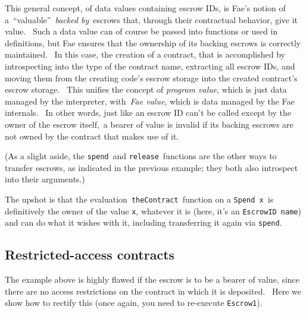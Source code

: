 \documentclass[11pt]{article}
\begin{document}

\vspace{11pt}

This general concept, of data values containing escrow IDs, is Fae's notion of a “valuable” \textit{backed by} escrows that, through their contractual behavior, give it value.  Such a data value can of course be passed into functions or used in definitions, but Fae ensures that the ownership of its backing escrows is correctly maintained.  In this case, the creation of a contract, that is accomplished by introspecting into the type of the contract name, extracting all escrow IDs, and moving them from the creating code's escrow storage into the created contract's escrow storage.  This unifies the concept of \textit{program value}, which is just data managed by the interpreter, with \textit{Fae value}, which is data managed by the Fae internals.  In other words, just like an escrow ID can't be called except by the owner of the escrow itself, a bearer of value is invalid if its backing escrows are not owned by the contract that makes use of it.


\vspace{11pt}

(As a slight aside, the \texttt{spend} and \texttt{release} functions are the other ways to transfer escrows, as indicated in the previous example; they both also introspect into their arguments.)


\vspace{11pt}

The upshot is that the evaluation \texttt{theContract} function on a \texttt{Spend x} is definitively the owner of the value \texttt{x}, whatever it is (here, it's an \texttt{EscrowID name}) and can do what it wishes with it, including transferring it again via \texttt{spend}.

\subsection{Restricted-access contracts}
\vspace{5.5pt}

The example above is highly flawed if the escrow is to be a bearer of value, since there are no access restrictions on the contract in which it is deposited.  Here we show how to rectify this (once again, you need to re-execute \texttt{Escrow1}).
\end{document}
